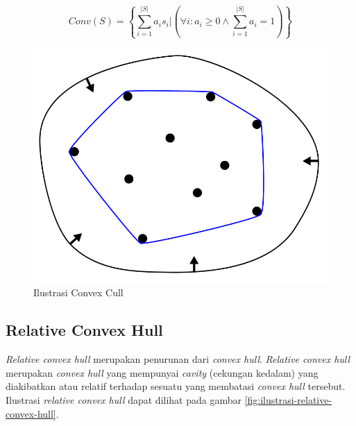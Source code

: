 \begin{equation}
    \label{eq:convex-hull}
    Conv(S)=\left\{ \sum_{i=1}^{|S|}{a_is_i} \big | (\forall{i}:a_i \ge 0 \wedge \sum_{i=1}^{|S|}{a_i=1} ) \right\}
\end{equation}
\begin{figure}[!h]
	\Centering
	\includegraphics [width=0.5\columnwidth]{bab2/img/ilustrasi-convex-hull}
	\caption {Ilustrasi Convex Cull}
	\label {fig:ilustrasi-convex-hull}
\end{figure}


\subsection{Relative Convex Hull}
\textit{Relative convex hull} merupakan penurunan dari \textit{convex hull}. \textit{Relative convex hull} merupakan \textit{convex hull} yang mempunyai \textit{cavity} (cekungan kedalam) yang diakibatkan atau relatif terhadap sesuatu yang membatasi \textit{convex hull} tersebut. Ilustrasi \textit{relative convex hull} dapat dilihat pada gambar \ref{fig:ilustrasi-relative-convex-hull}.

